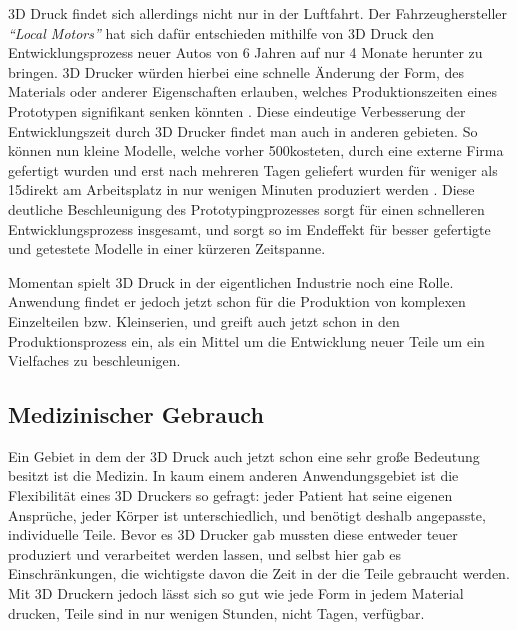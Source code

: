 3D Druck findet sich allerdings nicht nur in der Luftfahrt. Der Fahrzeughersteller \emph{\textquotedblleft Local Motors\textquotedblright} hat sich dafür entschieden mithilfe von 3D Druck den Entwicklungsprozess neuer Autos von 6 Jahren auf nur 4 Monate herunter zu bringen. 3D Drucker würden hierbei eine schnelle Änderung der Form, des Materials oder anderer Eigenschaften erlauben, welches Produktionszeiten eines Prototypen signifikant senken könnten \parencite{Local_Motor}. 
Diese eindeutige Verbesserung der Entwicklungszeit durch 3D Drucker findet man auch in anderen gebieten. So können nun kleine Modelle, welche vorher 500\EURO kosteten, durch eine externe Firma gefertigt wurden und erst nach mehreren Tagen geliefert wurden für weniger als 15\EURO direkt am Arbeitsplatz in nur wenigen Minuten produziert werden \parencite{BALDOR_CASE}.
Diese deutliche Beschleunigung des Prototypingprozesses sorgt für einen schnelleren Entwicklungsprozess insgesamt, und sorgt so im Endeffekt für besser gefertigte und getestete Modelle in einer kürzeren Zeitspanne.

Momentan spielt 3D Druck in der eigentlichen Industrie noch eine Rolle. Anwendung findet er jedoch jetzt schon für die Produktion von komplexen Einzelteilen bzw. Kleinserien, und greift auch jetzt schon in den Produktionsprozess ein, als ein Mittel um die Entwicklung neuer Teile um ein Vielfaches zu beschleunigen.

\subsection{Medizinischer Gebrauch}

Ein Gebiet in dem der 3D Druck auch jetzt schon eine sehr große Bedeutung besitzt ist die Medizin. In kaum einem anderen Anwendungsgebiet ist die Flexibilität eines 3D Druckers so gefragt: jeder Patient hat seine eigenen Ansprüche, jeder Körper ist unterschiedlich, und benötigt deshalb angepasste, individuelle Teile. Bevor es 3D Drucker gab mussten diese entweder teuer produziert und verarbeitet werden lassen, und selbst hier gab es Einschränkungen, die wichtigste davon die Zeit in der die Teile gebraucht werden. Mit 3D Druckern jedoch lässt sich so gut wie jede Form in jedem Material drucken, Teile sind in nur wenigen Stunden, nicht Tagen, verfügbar.


